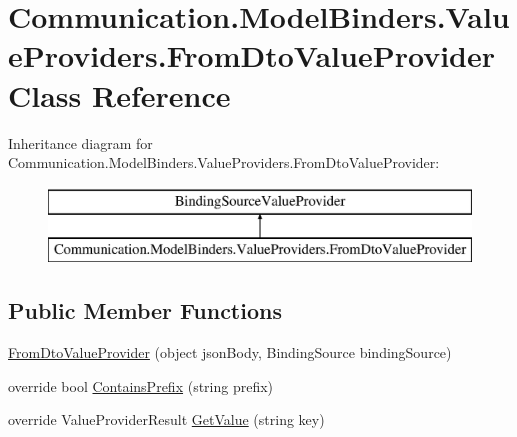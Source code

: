 \hypertarget{class_communication_1_1_model_binders_1_1_value_providers_1_1_from_dto_value_provider}{}\section{Communication.\+Model\+Binders.\+Value\+Providers.\+From\+Dto\+Value\+Provider Class Reference}
\label{class_communication_1_1_model_binders_1_1_value_providers_1_1_from_dto_value_provider}
Inheritance diagram for Communication.\+Model\+Binders.\+Value\+Providers.\+From\+Dto\+Value\+Provider\+:\begin{figure}[H]
\begin{center}
\leavevmode
\includegraphics[height=2.000000cm]{class_communication_1_1_model_binders_1_1_value_providers_1_1_from_dto_value_provider}
\end{center}
\end{figure}
\subsection*{Public Member Functions}
\begin{DoxyCompactItemize}
\item 
\mbox{\hyperlink{class_communication_1_1_model_binders_1_1_value_providers_1_1_from_dto_value_provider_a9ddf728279a718c01e6e5903c5b8c016}{From\+Dto\+Value\+Provider}} (object json\+Body, Binding\+Source binding\+Source)
\item 
override bool \mbox{\hyperlink{class_communication_1_1_model_binders_1_1_value_providers_1_1_from_dto_value_provider_a917bbc5d2f3cb896ae8457eb416afae5}{Contains\+Prefix}} (string prefix)
\item 
override Value\+Provider\+Result \mbox{\hyperlink{class_communication_1_1_model_binders_1_1_value_providers_1_1_from_dto_value_provider_a59f5649eff474dd94bf4ce538898272d}{Get\+Value}} (string key)
\end{DoxyCompactItemize}


